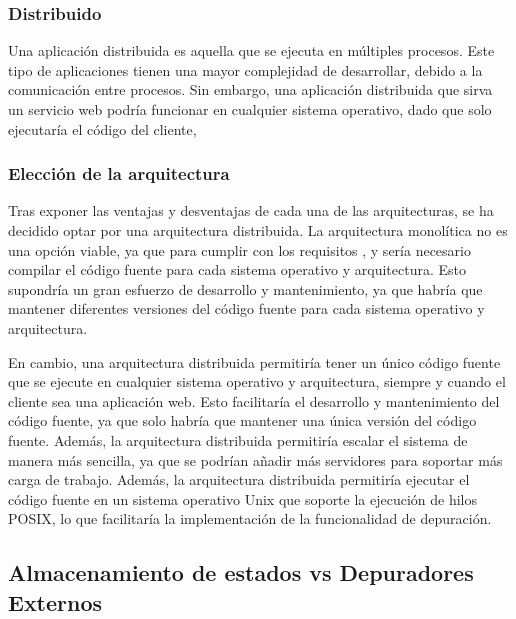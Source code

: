 \subsubsection{Distribuido} \label{subsubsec:distribuido}

Una \gls{aplicación distribuida} \cite {DistributedSystems} es aquella que se ejecuta en múltiples \glspl{proceso}. Este tipo de aplicaciones tienen una mayor complejidad de desarrollar, debido a la comunicación entre \glspl{proceso}. Sin embargo, una \gls{aplicación distribuida} que sirva un \gls{servicio web} podría funcionar en cualquier sistema operativo, dado que solo ejecutaría el código del cliente,

\subsubsection{Elección de la arquitectura} \label{subsec:eleccion-arquitectura}

Tras exponer las ventajas y desventajas de cada una de las arquitecturas, se ha decidido optar por una arquitectura distribuida. La arquitectura monolítica no es una opción viable, ya que para cumplir con los requisitos ,  y  sería necesario compilar el \gls{código fuente} para cada sistema operativo y arquitectura. Esto supondría un gran esfuerzo de desarrollo y mantenimiento, ya que habría que mantener diferentes versiones del \gls{código fuente} para cada sistema operativo y arquitectura.

En cambio, una arquitectura distribuida permitiría tener un único \gls{código fuente} que se ejecute en cualquier sistema operativo y arquitectura, siempre y cuando el cliente sea una \gls{aplicación web}. Esto facilitaría el desarrollo y mantenimiento del \gls{código fuente}, ya que solo habría que mantener una única versión del \gls{código fuente}. Además, la arquitectura distribuida permitiría escalar el sistema de manera más sencilla, ya que se podrían añadir más servidores para soportar más carga de trabajo.
Además, la arquitectura distribuida permitiría ejecutar el \gls{código fuente} en un sistema operativo \gls{Unix} que soporte la ejecución de \glspl{hilo} POSIX, lo que facilitaría la implementación de la funcionalidad de depuración.

\subsection{Almacenamiento de estados vs Depuradores Externos} \label{subsec:depuracion}


